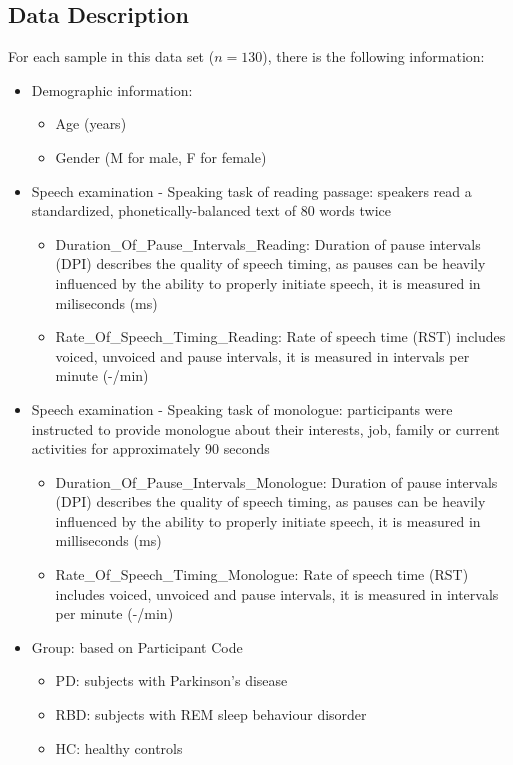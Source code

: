 \documentclass[
  english,
  doc,floatsintext]{apa6}
\providecommand{\tightlist}{%
  \setlength{\itemsep}{0pt}\setlength{\parskip}{0pt}}
\begin{document}
\hypertarget{data-description}{%
\subsection{Data Description}\label{data-description}}

For each sample in this data set (\(n=130\)), there is the following information:

\begin{itemize}
\tightlist
\item
  Demographic information:

  \begin{itemize}
  \tightlist
  \item
    Age (years)
  \item
    Gender (M for male, F for female)
  \end{itemize}
\item
  Speech examination - Speaking task of reading passage: speakers read a standardized, phonetically-balanced text of 80 words twice

  \begin{itemize}
  \tightlist
  \item
    Duration\_Of\_Pause\_Intervals\_Reading: Duration of pause intervals (DPI) describes the quality of speech timing, as pauses can be heavily influenced by the ability to properly initiate speech, it is measured in miliseconds (ms)
  \item
    Rate\_Of\_Speech\_Timing\_Reading: Rate of speech time (RST) includes voiced, unvoiced and pause intervals, it is measured in intervals per minute (-/min)
  \end{itemize}
\item
  Speech examination - Speaking task of monologue: participants were instructed to provide monologue about their interests, job, family or current activities for approximately 90 seconds

  \begin{itemize}
  \tightlist
  \item
    Duration\_Of\_Pause\_Intervals\_Monologue: Duration of pause intervals (DPI) describes the quality of speech timing, as pauses can be heavily influenced by the ability to properly initiate speech, it is measured in milliseconds (ms)
  \item
    Rate\_Of\_Speech\_Timing\_Monologue: Rate of speech time (RST) includes voiced, unvoiced and pause intervals, it is measured in intervals per minute (-/min)
  \end{itemize}
\item
  Group: based on Participant Code

  \begin{itemize}
  \tightlist
  \item
    PD: subjects with Parkinson's disease
  \item
    RBD: subjects with REM sleep behaviour disorder
  \item
    HC: healthy controls
  \end{itemize}
\end{itemize}
\end{document}
